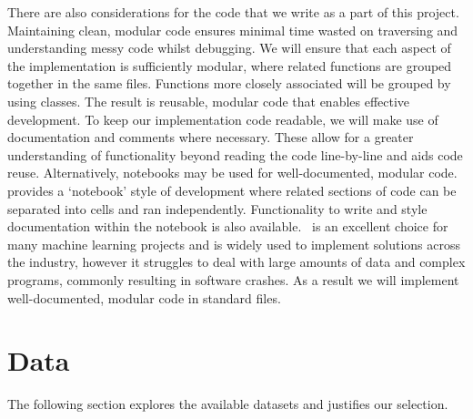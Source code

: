 There are also considerations for the code that we write as a part of this project. Maintaining clean, modular code ensures minimal time wasted on traversing and understanding messy code whilst debugging. We will ensure that each aspect of the implementation is sufficiently modular, where related functions are grouped together in the same  files. Functions more closely associated will be grouped by using  classes. The result is reusable, modular code that enables effective development. To keep our implementation code readable, we will make use of documentation and comments where necessary. These allow for a greater understanding of functionality beyond reading the code line-by-line and aids code reuse. Alternatively,  notebooks may be used for well-documented, modular code.\  provides a `notebook' style of development where related sections of code can be separated into cells and ran independently. Functionality to write and style documentation within the notebook is also available.\  is an excellent choice for many machine learning projects and is widely used to implement solutions across the industry, however it struggles to deal with large amounts of data and complex programs, commonly resulting in software crashes. As a result we will implement well-documented, modular code in standard  files.

\section{Data}
The following section explores the available datasets and justifies our selection.

